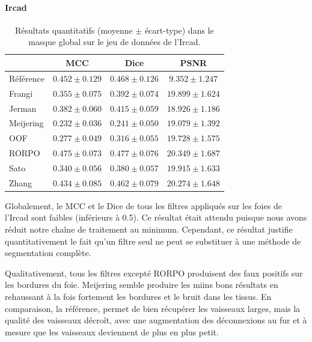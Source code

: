 \paragraph{Ircad}

\begin{table}[!ht]
  \begin{center}
      \caption{Résultats quantitatifs (moyenne $\pm$ écart-type) dans le masque global \maskglobal sur le jeu de données de l'Ircad.}
      \label{Table:quantitative results Ircad}
      \begin{tabular}{lccc}
          \hline
          & MCC & Dice & PSNR \\ 
          \hline
          Référence	& $ 0.452 \pm 0.129	$ & $ 0.468 \pm	0.126 $ & $	9.352  \pm  1.247 $ \\
          Frangi	    & $ 0.355 \pm 0.075	$ & $ 0.392 \pm	0.074 $ & $	19.899 \pm 	1.624 $ \\
          Jerman	    & $ 0.382 \pm 0.060	$ & $ 0.415 \pm	0.059 $ & $	18.926 \pm 	1.186 $ \\
          Meijering   & $ 0.232 \pm 0.036	$ & $ 0.241 \pm	0.050 $ & $	19.079 \pm 	1.392 $ \\
          OOF	        & $ 0.277 \pm 0.049	$ & $ 0.316 \pm	0.055 $ & $	19.728 \pm 	1.575 $ \\
          RORPO	    & $ 0.475 \pm 0.073	$ & $ 0.477 \pm	0.076 $ & $	20.349 \pm 	1.687 $ \\
          Sato	    & $ 0.340 \pm 0.056	$ & $ 0.380 \pm	0.057 $ & $	19.915 \pm 	1.633 $ \\
          Zhang	    & $ 0.434 \pm 0.085	$ & $ 0.462 \pm	0.079 $ & $	20.274 \pm 	1.648 $ \\
    
          \hline
      \end{tabular}  
      \end{center}    
\end{table}


Globalement, le MCC et le Dice de tous les filtres appliqués sur les foies de l'Ircad sont faibles (inférieurs à 0.5). Ce résultat était attendu puisque nous avons réduit notre chaîne de traitement au minimum. Cependant, ce résultat justifie quantitativement le fait qu'un filtre seul ne peut se substituer à une méthode de segmentation complète.

Qualitativement, tous les filtres excepté RORPO produisent des faux positifs sur les bordures du foie. Meijering semble produire les miins bons résultats en rehaussant à la fois fortement les bordures et le bruit dans les tissus. En comparaison, la référence, permet de bien récupérer les vaisseaux larges, mais la qualité des vaisseaux décroît, avec une augmentation des déconnexions au fur et à mesure que les vaisseaux deviennent de plus en plus petit. 

